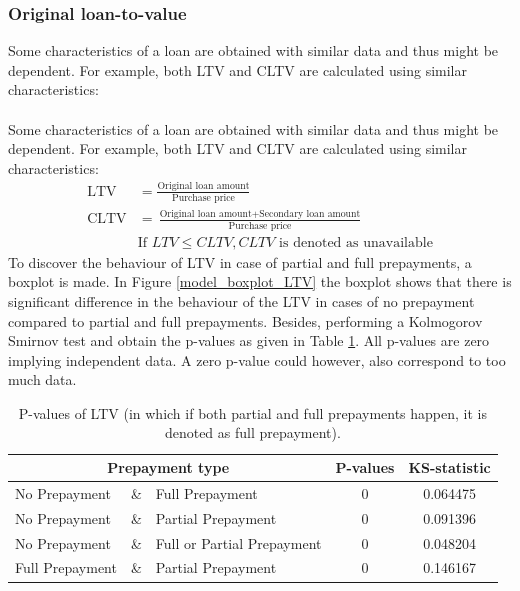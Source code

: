     \subsubsection{Original loan-to-value}
        Some characteristics of a loan are obtained with similar data 
        and thus might be dependent. For example, both LTV and CLTV 
        are calculated using similar characteristics: 
        \\\\
        Some characteristics of a loan are obtained with similar data 
        and thus might be dependent. For example, both LTV and CLTV 
        are calculated using similar characteristics: 
        \begin{align}
            \text{LTV}&=
            \frac{\text{Original loan amount}}{\text{Purchase price}}\\
            \text{CLTV}&=
            \frac{\text{Original loan amount}+\text{Secondary loan amount}}{\text{Purchase price}}\\
            &\text{If } LTV \leq CLTV, CLTV \text{ is denoted as unavailable}
        \end{align}
        To discover the behaviour of LTV in case of partial and full 
        prepayments, a boxplot is made. In Figure 
        \ref{model_boxplot_LTV} the boxplot shows that there is 
        significant difference in the behaviour of the LTV in cases of 
        no prepayment compared to partial and full prepayments. Besides, 
        performing a Kolmogorov Smirnov test and obtain the p-values as 
        given in Table \ref{model_Pvals_of_LTV}. All p-values are zero 
        implying independent data. A zero p-value could however, also 
        correspond to too much data. 
        \begin{table}[H]
        \centering
            \begin{tabular}{lcl|c|c}
                \multicolumn{3}{c|}{Prepayment type} 
                & P-values& KS-statistic \\\hline
                No Prepayment & \& & Full Prepayment & 0 & 0.064475\\
                No Prepayment & \& & Partial Prepayment & 0 & 0.091396\\
                No Prepayment & \& & Full or Partial Prepayment & 0 & 0.048204 \\
                Full Prepayment & \& & Partial Prepayment & 0 & 0.146167
		    \end{tabular}
            \caption{
                P-values of LTV (in which if both partial and full 
                prepayments happen, it is denoted as full prepayment).
                }
	        \label{model_Pvals_of_LTV}
        \end{table}
    
